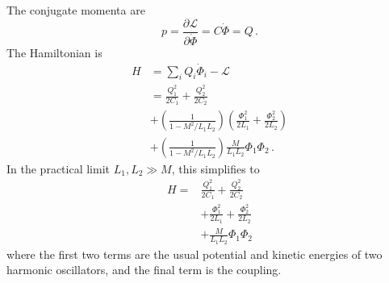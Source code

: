 The conjugate momenta are
\begin{equation}
p = \frac{\partial \mathcal{L}}{\partial \dot{\Phi}} = C \dot{\Phi} = Q \, .
\end{equation}
The Hamiltonian is
\begin{align}
H &= \sum_i Q_i \dot{\Phi}_i - \mathcal{L} \nonumber \\
&= \frac{Q_1^2}{2 C_1} + \frac{Q_2^2}{2 C_2} \nonumber \\
&+ \left( \frac{1}{1 - M^2 / L_1L_2} \right)
\left( \frac{\Phi_1^2}{2L_1} + \frac{\Phi_2^2}{2L_2} \right) \nonumber \\
&+ \left( \frac{1}{1 - M^2 / L_1 L_2} \right) \frac{M}{L_1 L_2} \Phi_1 \Phi_2 \, .
\end{align}
In the practical limit $L_1,L_2 \gg M$, this simplifies to
\begin{align}
  H =&
      \frac{Q_1^2}{2C_1} + \frac{Q_2^2}{2C_2} \nonumber \\
  & + \frac{\Phi_1^2}{2L_1} + \frac{\Phi_2^2}{2L_2} \nonumber \\
  & + \frac{M}{L_1 L_2} \Phi_1 \Phi_2
\end{align}
where the first two terms are the usual potential and kinetic energies of two harmonic oscillators, and the final term is the coupling.
